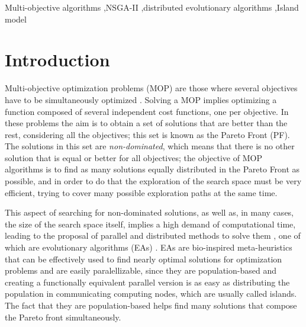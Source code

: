 \documentclass[preprint]{elsarticle}
\begin{document}
\begin{frontmatter}
\begin{abstract}
\end{abstract}


\begin{keyword}
Multi-objective algorithms \sep NSGA-II  \sep distributed evolutionary algorithms \sep Island model
\end{keyword}

\end{frontmatter}





\section{Introduction}


Multi-objective optimization problems (MOP) are those where several
objectives have to be simultaneously optimized
\citep{Mora13paretobased,LIU2017344}. Solving a MOP implies optimizing a function composed of several independent cost functions, one per objective. In
these problems the aim is to obtain a set of solutions that are better
than the rest, considering all the objectives; this set is known as
the Pareto Front (PF). The solutions in this set are {\em non-dominated},
which means that there is no other solution that is equal or better
for all objectives; the objective of MOP algorithms is to find as many
solutions equally distributed in the Pareto Front as possible, and in order to do that the
exploration of the search space must be very efficient, trying to
cover many possible exploration paths at the same time. 

This aspect of searching for non-dominated solutions, as well as, in
many cases, the size of the search space itself, implies a high demand
of computational time, leading to the proposal of parallel and distributed methods to solve them
\citep{Luna15Survey,Mukhopadhyay14Survey,Chavez15MO,Hidalgo16residualstress,KAUR2018183,XU2018268},
one of which are evolutionary algorithms (EAs)
\citep{DBLP:series/ncs/EibenS15}. EAs are bio-inspired meta-heuristics
that can be effectively used to find nearly optimal solutions for
optimization problems and are easily paralellizable, since they are
population-based and creating a functionally equivalent parallel
version is as easy as distributing the population in communicating
computing nodes, which are usually called islands. The fact that
they are population-based helps find many solutions that compose the
Pareto front simultaneously.
\end{document}
